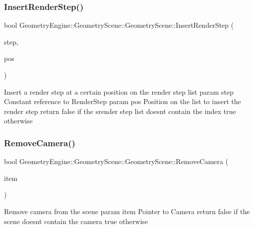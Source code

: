 \subsubsection{\texorpdfstring{InsertRenderStep()}{InsertRenderStep()}}
{\footnotesize\ttfamily bool Geometry\+Engine\+::\+Geometry\+Scene\+::\+Geometry\+Scene\+::\+Insert\+Render\+Step (\begin{DoxyParamCaption}\item[{const \mbox{\hyperlink{class_geometry_engine_1_1_geometry_render_step_1_1_render_step}{Geometry\+Render\+Step\+::\+Render\+Step}} \&}]{step,  }\item[{unsigned int}]{pos }\end{DoxyParamCaption})\hspace{0.3cm}{\ttfamily [virtual]}}

Insert a render step at a certain position on the render step list param step Constant reference to Render\+Step param pos Position on the list to insert the render step return false if the srender step list doesn\textquotesingle{}t contain the index true otherwise \mbox{\label{class_geometry_engine_1_1_geometry_scene_1_1_geometry_scene_ae5607835364c78780386efb5dbde3fff}} 
\subsubsection{\texorpdfstring{RemoveCamera()}{RemoveCamera()}}
{\footnotesize\ttfamily bool Geometry\+Engine\+::\+Geometry\+Scene\+::\+Geometry\+Scene\+::\+Remove\+Camera (\begin{DoxyParamCaption}\item[{\mbox{\hyperlink{class_geometry_engine_1_1_geometry_world_item_1_1_geometry_camera_1_1_camera}{Geometry\+World\+Item\+::\+Geometry\+Camera\+::\+Camera}} $\ast$}]{item }\end{DoxyParamCaption})\hspace{0.3cm}{\ttfamily [virtual]}}

Remove camera from the scene param item Pointer to Camera return false if the scene doesn\textquotesingle{}t contain the camera true otherwise \mbox{\label{class_geometry_engine_1_1_geometry_scene_1_1_geometry_scene_afc7294415ed5013f22c4c8e587437019}} 
